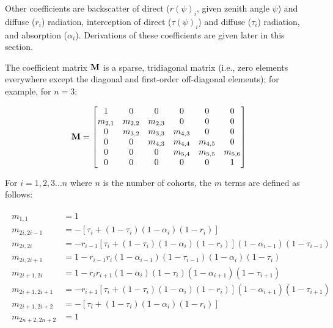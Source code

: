Other coefficients are
backscatter of direct ($r(\psi)_{i}$, given zenith angle $\psi$) and diffuse ($r_{i}$) radiation,
interception of direct ($\tau(\psi)_{i}$) and diffuse ($\tau_{i}$) radiation,
and absorption ($\alpha_{i}$).
Derivations of these coefficients are given later in this section.

The coefficient matrix $\mathbf{M}$ is a sparse, tridiagonal matrix (i.e., zero elements everywhere except the diagonal and first-order off-diagonal elements); for example, for $n=3$:

\begin{equation}
  \mathbf{M} = \begin{bmatrix}
    1 & 0 & 0 & 0 & 0 & 0 \\
    m_{2,1} & m_{2,2} & m_{2,3} & 0 & 0 & 0 \\
    0 & m_{3,2} & m_{3,3} & m_{4,3} & 0 & 0 \\
    0 & 0 & m_{4,3} & m_{4,4} & m_{4,5} & 0 \\
    0 & 0 & 0 & m_{5,4} & m_{5,5} & m_{5,6} \\
    0 & 0 & 0 & 0 & 0 & 1 \\
  \end{bmatrix}
\end{equation}

For $i = 1,2,3...n$ where $n$ is the number of cohorts, the $m$ terms are defined as follows:

\begin{align}
  \begin{split}
    m_{1,1} &= 1\\
    m_{2i,2i-1} &= - \left[ \tau_i + (1 - \tau_i)(1 - \alpha_i)(1 - r_i) \right]\\
    m_{2i,2i} &= -r_{i-1} \left[ \tau_i + (1 - \tau_i)(1 - \alpha_i)(1 - r_i) \right] (1 - \alpha_{i-1})(1 - \tau_{i-1})\\
    m_{2i,2i+1} &= 1 - r_{i-1} r_i (1 - \alpha_{i-1})(1 - \tau_{i-1})(1 - \alpha_i)(1 - \tau_i)\\
    m_{2i+1,2i} &= 1 - r_i r_{i+1} (1 - \alpha_i)(1 - \tau_i)(1 - \alpha_{i+1})(1 - \tau_{i+1})\\
    m_{2i+1,2i+1} &= -r_{i+1} \left[ \tau_i + (1 - \tau_i)(1 - \alpha_i)(1 - r_i) \right] (1 - \alpha_{i+1})(1 - \tau_{i+1})\\
    m_{2i+1,2i+2} &= - \left[ \tau_i + (1 - \tau_i)(1 - \alpha_i)(1 - r_i) \right]\\
    m_{2n+2,2n+2} &= 1
  \end{split}
\end{align}

